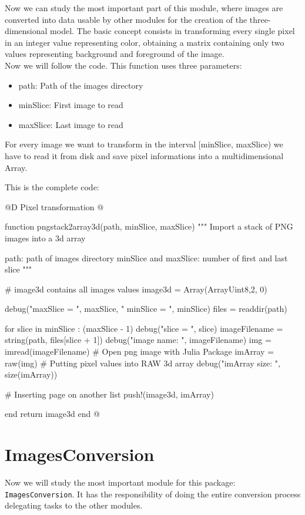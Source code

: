 \documentclass[11pt,oneside]{article}	%
\begin{document}
Now we can study the most important part of this module, where images are converted into data usable by other modules for the creation of the three-dimensional model. The basic concept consists in transforming every single pixel in an integer value representing color, obtaining a matrix containing only two values representing background and foreground of the image.\\
Now we will follow the code. This function uses three parameters:

\begin{itemize}
 \item path: Path of the images directory
 \item minSlice: First image to read
 \item maxSlice: Last image to read
\end{itemize}

For every image we want to transform in the interval [minSlice, maxSlice) we have to read it from disk and save pixel informations into a multidimensional Array.

This is the complete code:

@D Pixel transformation
@{function pngstack2array3d(path, minSlice, maxSlice)
  """
  Import a stack of PNG images into a 3d array

  path: path of images directory
  minSlice and maxSlice: number of first and last slice
  """

  # image3d contains all images values
  image3d = Array(Array{Uint8,2}, 0)

  debug("maxSlice = ", maxSlice, " minSlice = ", minSlice)
  files = readdir(path)

  for slice in minSlice : (maxSlice - 1)
    debug("slice = ", slice)
    imageFilename = string(path, files[slice + 1])
    debug("image name: ", imageFilename)
    img = imread(imageFilename) # Open png image with Julia Package
    imArray = raw(img) # Putting pixel values into RAW 3d array
    debug("imArray size: ", size(imArray))

    # Inserting page on another list
    push!(image3d, imArray)

  end
  return image3d
end
@}

\section{ImagesConversion}\label{sec:ImagesConversion}
Now we will study the most important module for this package: \texttt{ImagesConversion}. It has the responsibility of doing the entire conversion process delegating tasks to the other modules.
\end{document}
